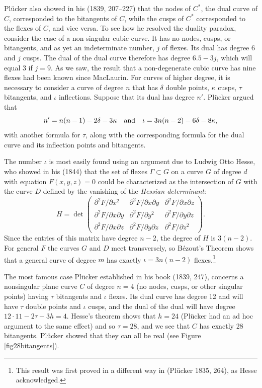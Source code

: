 Pl\"ucker also showed in his (1839, 207--227) that the nodes of $C^{*}$, the dual curve of $C$,  corresponded to the bitangents of $C$, while the cusps of $C^{*}$ corresponded to the flexes of $C$, and vice versa. To see how he resolved the duality paradox, consider  the case of a non-singular cubic curve. It has no nodes, cusps, or bitangents, and as yet an indeterminate number, $j$ of flexes. Its dual has degree 6 and $j$ cusps. The dual of the dual curve therefore has degree $6.5 - 3j$, which will equal 3 if $j = 9.$ As we saw, the result that a non-degenerate cubic curve has nine flexes had been known since MacLaurin. For curves of higher degree, it is necessary to consider a curve of degree $n$ that has $\delta$ double points, $\kappa$ cusps, $\tau$ bitangents, and $\iota$ inflections. Suppose that its dual has degree $n'$. Pl\"ucker argued that
$$
n' = n(n-1) - 2\delta - 3 \kappa
\quad
\hbox{and}\quad \iota = 3n(n-2) - 6\delta - 8\kappa,
$$
with another formula for $\tau$, along with the corresponding formula for the dual curve and its inflection points and bitangents.

The number $\iota$ is most easily found using an argument due to Ludwig Otto Hesse, who showed  in his (1844)  that the set of flexes $\Gamma\subset G$ on a curve $G$ of degree $d$ with equation $F(x, y, z) = 0$ could be characterized as the intersection of $G$  with the curve $D$ defined by the vanishing of the \emph{Hessian determinant}:
$$
H = \det \begin{pmatrix}
 \partial^{2}F/\partial x^{2} &\partial^{2}F/\partial x\partial y &\partial^{2}F/\partial x\partial z \\
\partial^{2}F/\partial x\partial y  &\partial^{2}F/\partial y^{2} &\partial^{2}F/\partial y\partial z \\
\partial^{2}F/\partial x\partial z &\partial^{2}F/\partial y\partial z &\partial^{2}F/\partial z^{2} 
\end{pmatrix}.
$$
Since the entries of this matrix have degree $n-2$, the degree of $H$ is $3(n-2).$ For general $F$ the curves $G$ and $D$ meet transversely, so B\'ezout's Theorem shows that a general curve of degree $m$ has exactly $\iota = 3n(n-2)$ flexes.\footnote{This result was first proved in a different way in (Pl\"ucker 1835, 264), as Hesse acknowledged.}

The most famous case Pl\"ucker established in  his book (1839, 247),  concerns   a nonsingular plane curve $C$ of degree $n=4$  (no nodes, cusps, or other singular points) having $\tau$ bitangents and $\iota$ flexes.   Its dual curve has degree 12 and will have $\tau$ double points and $\iota$ cusps, and the dual of the dual will have degree 
$12\cdot 11 - 2\tau - 3h  = 4.$ 
Hesse's theorem shows that $h = 24$ (Pl\"ucker  had an ad hoc argument to the same effect)  and so $\tau = 28$,  and we  see that $C$ has exactly 28 bitangents. Pl\"ucker showed that they can all be real (see Figure \ref{fig28bitangents}).

